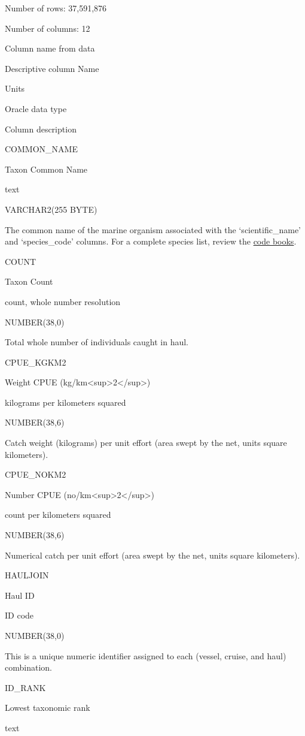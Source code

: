 \documentclass[
  letterpaper,
  oneside,
  open=any]{scrbook}
\begin{document}
Number of rows: 37,591,876

Number of columns: 12

Column name from data

Descriptive column Name

Units

Oracle data type

Column description

COMMON\_NAME

Taxon Common Name

text

VARCHAR2(255 BYTE)

The common name of the marine organism associated with the
`scientific\_name' and `species\_code' columns. For a complete species
list, review the
\href{https://www.fisheries.noaa.gov/resource/document/groundfish-survey-species-code-manual-and-data-codes-manual}{code
books}.

COUNT

Taxon Count

count, whole number resolution

NUMBER(38,0)

Total whole number of individuals caught in haul.

CPUE\_KGKM2

Weight CPUE (kg/km\textless sup\textgreater2\textless/sup\textgreater)

kilograms per kilometers squared

NUMBER(38,6)

Catch weight (kilograms) per unit effort (area swept by the net, units
square kilometers).

CPUE\_NOKM2

Number CPUE (no/km\textless sup\textgreater2\textless/sup\textgreater)

count per kilometers squared

NUMBER(38,6)

Numerical catch per unit effort (area swept by the net, units square
kilometers).

HAULJOIN

Haul ID

ID code

NUMBER(38,0)

This is a unique numeric identifier assigned to each (vessel, cruise,
and haul) combination.

ID\_RANK

Lowest taxonomic rank

text
\end{document}
